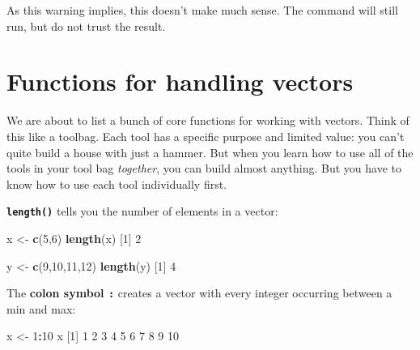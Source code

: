 \documentclass[
]{book}
\newenvironment{Shaded}{\begin{snugshade}}{\end{snugshade}}
\newcommand{\DecValTok}[1]{\textcolor[rgb]{0.00,0.00,0.81}{#1}}
\newcommand{\KeywordTok}[1]{\textcolor[rgb]{0.13,0.29,0.53}{\textbf{#1}}}
\newcommand{\NormalTok}[1]{#1}
\newcommand{\OperatorTok}[1]{\textcolor[rgb]{0.81,0.36,0.00}{\textbf{#1}}}
\newcommand{\StringTok}[1]{\textcolor[rgb]{0.31,0.60,0.02}{#1}}
\begin{document}
As this warning implies, this doesn't make much sense. The command will still run, but do not trust the result.

\hypertarget{functions-for-handling-vectors}{%
\section*{Functions for handling vectors}\label{functions-for-handling-vectors}}

We are about to list a bunch of core functions for working with vectors. Think of this like a toolbag. Each tool has a specific purpose and limited value: you can't quite build a house with just a hammer. But when you learn how to use all of the tools in your tool bag \emph{together}, you can build almost anything. But you have to know how to use each tool individually first.

\textbf{\texttt{length()}} tells you the number of elements in a vector:

\begin{Shaded}
\begin{Highlighting}[]
\NormalTok{x <-}\StringTok{ }\KeywordTok{c}\NormalTok{(}\DecValTok{5}\NormalTok{,}\DecValTok{6}\NormalTok{)}
\KeywordTok{length}\NormalTok{(x)}
\NormalTok{[}\DecValTok{1}\NormalTok{] }\DecValTok{2}
\end{Highlighting}
\end{Shaded}

\begin{Shaded}
\begin{Highlighting}[]
\NormalTok{y <-}\StringTok{ }\KeywordTok{c}\NormalTok{(}\DecValTok{9}\NormalTok{,}\DecValTok{10}\NormalTok{,}\DecValTok{11}\NormalTok{,}\DecValTok{12}\NormalTok{)}
\KeywordTok{length}\NormalTok{(y)}
\NormalTok{[}\DecValTok{1}\NormalTok{] }\DecValTok{4}
\end{Highlighting}
\end{Shaded}

The \textbf{colon symbol \texttt{:}} creates a vector with every integer occurring between a min and max:

\begin{Shaded}
\begin{Highlighting}[]
\NormalTok{x <-}\StringTok{ }\DecValTok{1}\OperatorTok{:}\DecValTok{10}
\NormalTok{x}
\NormalTok{ [}\DecValTok{1}\NormalTok{]  }\DecValTok{1}  \DecValTok{2}  \DecValTok{3}  \DecValTok{4}  \DecValTok{5}  \DecValTok{6}  \DecValTok{7}  \DecValTok{8}  \DecValTok{9} \DecValTok{10}
\end{Highlighting}
\end{Shaded}
\end{document}
